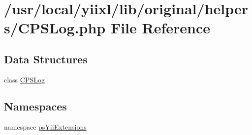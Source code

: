 \hypertarget{CPSLog_8php}{
\section{/usr/local/yiixl/lib/original/helpers/CPSLog.php File Reference}
\label{CPSLog_8php}
}
\subsection*{Data Structures}
\begin{DoxyCompactItemize}
\item 
class \hyperlink{classCPSLog}{CPSLog}
\end{DoxyCompactItemize}
\subsection*{Namespaces}
\begin{DoxyCompactItemize}
\item 
namespace \hyperlink{namespacepsYiiExtensions}{psYiiExtensions}
\end{DoxyCompactItemize}
